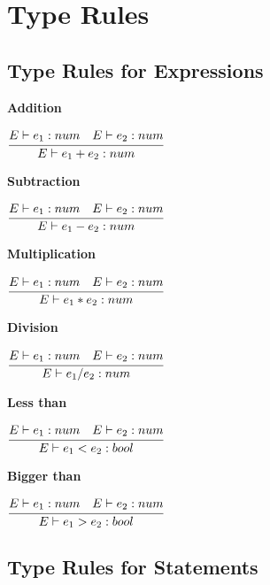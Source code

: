 \section{Type Rules}


\subsection{Type Rules for Expressions}
\textbf{Addition}\\
\begin{center}
	\begin{math}
	\cfrac
	{E \vdash e_1: num \quad E \vdash e_2: num}
	{E \vdash e_1 + e_2 : num}
	\end{math}
\end{center}

\textbf{Subtraction}\\
\begin{center}
	\begin{math}
	\cfrac
	{E \vdash e_1: num \quad E \vdash e_2: num}
	{E \vdash e_1 - e_2 : num}
	\end{math}
\end{center}

\textbf{Multiplication}\\
\begin{center}
	\begin{math}
	\cfrac
	{E \vdash e_1: num \quad E \vdash e_2: num}
	{E \vdash e_1 * e_2 : num}
	\end{math}
\end{center}

\textbf{Division}\\
\begin{center}
	\begin{math}
	\cfrac
	{E \vdash e_1: num \quad E \vdash e_2: num}
	{E \vdash e_1 / e_2 : num}
	\end{math}
\end{center}

\textbf{Less than}\\
\begin{center}
	\begin{math}
	\cfrac
	{E \vdash e_1: num \quad E \vdash e_2: num}
	{E \vdash e_1 < e_2 : bool}
	\end{math}
\end{center}

\textbf{Bigger than}\\
\begin{center}
	\begin{math}
	\cfrac
	{E \vdash e_1: num \quad E \vdash e_2: num}
	{E \vdash e_1 > e_2 : bool}
	\end{math}
\end{center}


\subsection{Type Rules for Statements}


